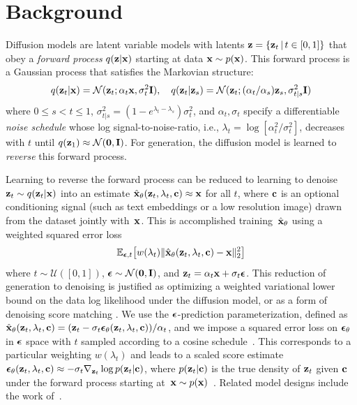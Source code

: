 \section{Background}
\label{sec:app_background}
\label{sec:app_background_diffusion}

Diffusion models are latent variable models with latents $\mathbf{z} = \{\mathbf{z}_t \,|\, t \in [0,1]\}$ that obey a \emph{forward process} $q(\mathbf{z}|\mathbf{x})$ starting at data $\mathbf{x} \sim p(\mathbf{x})$. This forward process is a Gaussian process that satisfies the Markovian structure:
\begin{align}
    q(\mathbf{z}_t|\mathbf{x}) = \mathcal{N}(\mathbf{z}_t; \alpha_t \mathbf{x}, \sigma_t^2 \mathbf{I}), \quad
    q(\mathbf{z}_t | \mathbf{z}_s) = \mathcal{N}(\mathbf{z}_t; (\alpha_t/\alpha_s)\mathbf{z}_s, \sigma_{t|s}^2\mathbf{I})
\end{align}
where $0 \leq s < t \leq 1$, $\sigma^2_{t|s} = (1-e^{\lambda_t-\lambda_s})\sigma_t^2$, and $\alpha_t, \sigma_t$ specify a differentiable \emph{noise schedule} whose log signal-to-noise-ratio,
i.e., $\lambda_t = \log[\alpha_t^2/\sigma_t^2]$,  decreases with $t$ until $q(\mathbf{z}_1) \approx \mathcal{N}(\mathbf{0}, \mathbf{I})$. 
For generation, the diffusion model is learned to \emph{reverse} this forward process.

Learning to reverse the forward process can be reduced to learning to denoise $\mathbf{z}_t\sim q(\mathbf{z}_t|\mathbf{x})$ into an estimate $\hat{\mathbf{x}}_\theta(\mathbf{z}_t, \lambda_t, \mathbf{c}) \approx \mathbf{x}$ for all $t$, where $\mathbf{c}$ is an optional conditioning signal (such as text embeddings or a low resolution image) drawn from the dataset jointly with~$\mathbf{x}$. This is accomplished training~$\hat{\mathbf{x}}_\theta$ using a weighted squared error loss
\begin{align}
    \mathbb{E}_{{\boldsymbol{\epsilon}},t}\!\left[w(\lambda_t) \|\hat{\mathbf{x}}_\theta(\mathbf{z}_t, \lambda_t, \mathbf{c}) - \mathbf{x} \|^2_2\right]
\end{align}
where $t \sim \mathcal{U}([0, 1])$, ${\boldsymbol{\epsilon}} \sim \mathcal{N}(\mathbf{0},\mathbf{I})$, and $\mathbf{z}_t = \alpha_t\mathbf{x} + \sigma_t{\boldsymbol{\epsilon}}$. This reduction of generation to denoising is justified as optimizing a weighted variational lower bound on the data log likelihood under the diffusion model, or as a form of denoising score matching \citep{vincent2011connection, song2019generative, ho2020denoising, kingma2021variational}. We use the ${\boldsymbol{\epsilon}}$-prediction parameterization, defined as $\hat{\mathbf{x}}_\theta(\mathbf{z}_t,\lambda_t,\mathbf{c}) =  (\mathbf{z}_t - \sigma_t {\boldsymbol{\epsilon}}_\theta(\mathbf{z}_t,\lambda_t,\mathbf{c}))/\alpha_t$, and we impose a squared error loss on ${\boldsymbol{\epsilon}}_\theta$ in ${\boldsymbol{\epsilon}}$ space with $t$ sampled according to a cosine schedule~\citep{nichol2021improved}. This corresponds to a particular weighting $w(\lambda_t)$ and leads to a scaled score estimate ${\boldsymbol{\epsilon}}_\theta(\mathbf{z}_t,\lambda_t,\mathbf{c}) \approx -\sigma_t \nabla_{\mathbf{z}_t}\log p(\mathbf{z}_t|\mathbf{c})$, where $p(\mathbf{z}_t|\mathbf{c})$ is the true density of $\mathbf{z}_t$ given $\mathbf{c}$ under the forward process starting at~$\mathbf{x} \sim p(\mathbf{x})$~\citep{ho2020denoising,kingma2021variational,song2020score}. Related model designs include the work of~\citep{tzen2019neural,kadkhodaie2020solving,kadkhodaie2021stochastic}.

